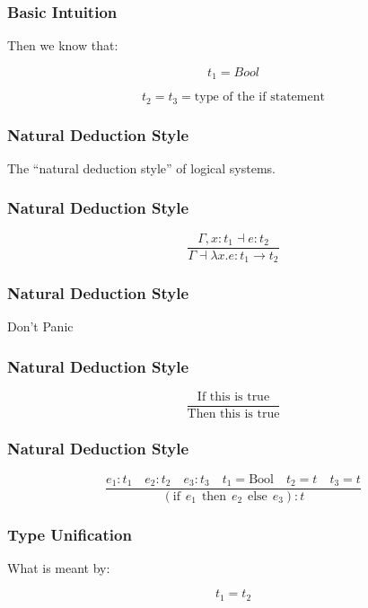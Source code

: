 \documentclass{beamer}
\begin{document}
\begin{frame}
\frametitle{Basic Intuition}
\begin{center}
\huge{
Then we know that:

$$t_1 = Bool$$

$$t_2 = t_3 = \text{type of the if statement}$$}
\end{center}
\end{frame}


\begin{frame}
\frametitle{Natural Deduction Style}
\begin{center}
\huge{
The ``natural deduction style'' of logical systems.
}
\end{center}
\end{frame}

\begin{frame}
\frametitle{Natural Deduction Style}
\Huge{
$$\frac{\Gamma,x:t_1\dashv{}e:t_2}{\Gamma\dashv{}\lambda{}x.e:t_1\rightarrow{}t_2}$$
}
\end{frame}

\begin{frame}
\frametitle{Natural Deduction Style}
\begin{center}
\Huge{
Don't Panic
}
\end{center}
\end{frame}

\begin{frame}
\frametitle{Natural Deduction Style}
\huge{
$$\frac{\text{If this is true}}{\text{Then this is true}}$$
}
\end{frame}

\begin{frame}
\frametitle{Natural Deduction Style}
\Large{
$$\frac{e_1:t_1\quad{}e_2:t_2\quad{}e_3:t_3\quad{}t_1 = \text{Bool}\quad{}t_2 = t\quad{}t_3 = t}{
(\text{if}\hspace{5pt}e_1\hspace{5pt}\text{then}\hspace{5pt}e_2
\hspace{5pt}\text{else}\hspace{5pt}e_3):t}$$
}
\end{frame}

\begin{frame}
\frametitle{Type Unification}
\begin{center}
\Huge{
What is meant by:

$$t_1 = t_2$$
}
\end{center}
\end{frame}
\end{document}
